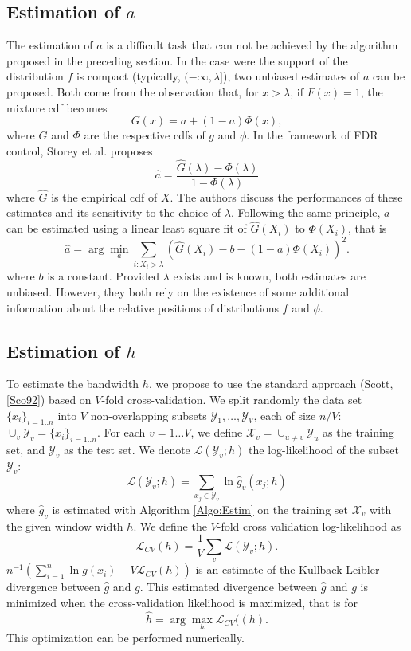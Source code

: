 \documentclass[10pt]{article}
\newcommand{\Lcal}{{\mathcal L}}
\newcommand{\Xcal}{{\mathcal X}}
\newcommand{\Ycal}{{\mathcal Y}}
\begin{document}
\subsection{Estimation of $a$} \label{Subsec:EstimA}
The estimation of $a$ is a difficult task that can not be achieved by the algorithm proposed in the preceding section. In the case were the support of the
distribution $f$ is compact (typically, $(-\infty, \lambda]$), two unbiased estimates of $a$ can be proposed. Both come from the observation that, for $x >
\lambda$, if $F(x)=1$, the mixture cdf becomes
$$
G(x) = a + (1-a)\Phi(x),
$$
where $G$ and $\Phi$ are the respective cdfs of $g$ and $\phi$. In the framework of FDR control, Storey et al. \cite{STS04} proposes
$$
\widehat{a} = \frac{\widehat{G}(\lambda)-\Phi(\lambda)}{1-\Phi(\lambda)}
$$
where $\widehat{G}$ is the empirical cdf of $X$. The authors discuss the performances of these estimates and its sensitivity to the choice of $\lambda$.
Following the same principle, $a$ can be estimated using a linear least square fit of $\widehat{G}(X_i)$ to $\Phi(X_i)$, that is
$$
\widehat{a} = \arg\min_a \sum_{i:X_i > \lambda} (\widehat{G}(X_i) - b-(1-a)\Phi(X_i))^2.
$$
where $b$ is a constant. Provided $\lambda$ exists and is known, both estimates are unbiased. However, they both rely on the existence of some additional
information about the relative positions of distributions $f$ and $\phi$.

\subsection{Estimation of $h$}
To estimate the bandwidth $h$, we propose to use the standard approach (Scott, \ref{Sco92}) based on $V$-fold cross-validation. We split randomly the data set
$\{x_i\}_{i=1..n}$ into $V$ non-overlapping subsets $\Ycal_1, \dots, \Ycal_V$, each of size $n/V$: $\cup_v \Ycal_v = \{x_i\}_{i=1..n}$.  For each $v=1\ldots
V$, we define $\Xcal_v = \cup_{u
  \neq v} \Ycal_u$ as the training set, and $\Ycal_v$ as the test set.
We denote $\Lcal(\Ycal_v; h)$ the log-likelihood of the subset
$\Ycal_v$:
$$
\Lcal(\Ycal_v; h) = \sum_{x_j \in \Ycal_v} \ln \widehat{g}_v(x_j; h)
$$
where $\widehat{g}_v$ is estimated with Algorithm \ref{Algo:Estim} on the training set $\Xcal_v$ with the given window width $h$. We define the $V$-fold cross
validation log-likelihood as
$$
\Lcal_{CV}(h) = \frac1V \sum_v \Lcal(\Ycal_v; h).
$$
$n^{-1} \left(\sum_{i=1}^{n} \ln g(x_i) - V \Lcal_{CV}(h)\right)$ is an estimate of the Kullback-Leibler divergence between $\widehat{g}$ and $g$. This
estimated divergence between $\widehat{g}$ and $g$ is minimized when the cross-validation likelihood is maximized, that is for
$$
\widehat{h} = \arg \max_{h} \Lcal_{CV}((h).
$$
This optimization can be performed numerically.
\end{document}
